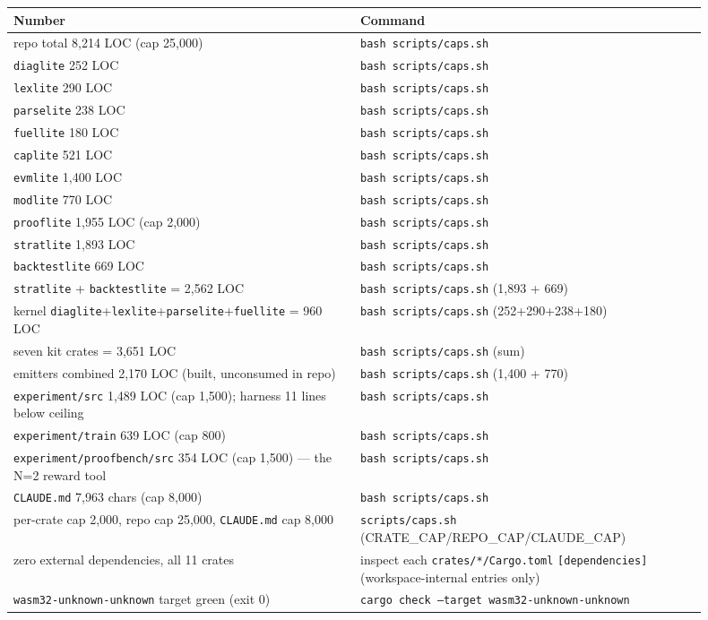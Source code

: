 \documentclass[11pt]{article}
\newcommand{\code}[1]{\texttt{#1}}
\begin{document}
\begingroup\small
\begin{longtable}{p{0.450\linewidth} p{0.450\linewidth}}
\toprule
\textbf{Number} & \textbf{Command} \\
\midrule\endhead
repo total 8,214 LOC (cap 25,000) & \code{bash scripts/caps.sh} \\
\code{diaglite} 252 LOC & \code{bash scripts/caps.sh} \\
\code{lexlite} 290 LOC & \code{bash scripts/caps.sh} \\
\code{parselite} 238 LOC & \code{bash scripts/caps.sh} \\
\code{fuellite} 180 LOC & \code{bash scripts/caps.sh} \\
\code{caplite} 521 LOC & \code{bash scripts/caps.sh} \\
\code{evmlite} 1,400 LOC & \code{bash scripts/caps.sh} \\
\code{modlite} 770 LOC & \code{bash scripts/caps.sh} \\
\code{prooflite} 1,955 LOC (cap 2,000) & \code{bash scripts/caps.sh} \\
\code{stratlite} 1,893 LOC & \code{bash scripts/caps.sh} \\
\code{backtestlite} 669 LOC & \code{bash scripts/caps.sh} \\
\code{stratlite} + \code{backtestlite} = 2,562 LOC & \code{bash scripts/caps.sh} (1,893 + 669) \\
kernel \code{diaglite}+\code{lexlite}+\code{parselite}+\code{fuellite} = 960 LOC & \code{bash scripts/caps.sh} (252+290+238+180) \\
seven kit crates = 3,651 LOC & \code{bash scripts/caps.sh} (sum) \\
emitters combined 2,170 LOC (built, unconsumed in repo) & \code{bash scripts/caps.sh} (1,400 + 770) \\
\code{experiment/src} 1,489 LOC (cap 1,500); harness 11 lines below ceiling & \code{bash scripts/caps.sh} \\
\code{experiment/train} 639 LOC (cap 800) & \code{bash scripts/caps.sh} \\
\code{experiment/proofbench/src} 354 LOC (cap 1,500) --- the N=2 reward tool & \code{bash scripts/caps.sh} \\
\code{CLAUDE.md} 7,963 chars (cap 8,000) & \code{bash scripts/caps.sh} \\
per-crate cap 2,000, repo cap 25,000, \code{CLAUDE.md} cap 8,000 & \code{scripts/caps.sh} (CRATE\_CAP/REPO\_CAP/CLAUDE\_CAP) \\
zero external dependencies, all 11 crates & inspect each \code{crates/*/Cargo.toml} \code{[dependencies]} (workspace-internal entries only) \\
\code{wasm32-unknown-unknown} target green (exit 0) & \code{cargo check --target wasm32-unknown-unknown} \\
\bottomrule
\end{longtable}\endgroup
\end{document}
